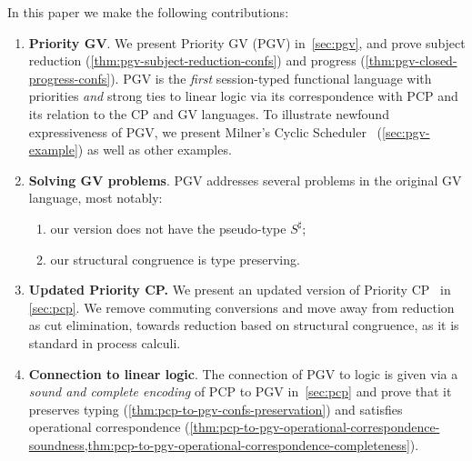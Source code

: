 \documentclass[main.tex]{subfiles}
\begin{document}
In this paper we make the following contributions:
\begin{enumerate}
\item
\textbf{Priority GV}. We present Priority GV (PGV) in~\cref{sec:pgv}, and prove subject reduction (\cref{thm:pgv-subject-reduction-confs}) and progress (\cref{thm:pgv-closed-progress-confs}).
PGV is the \emph{first} session-typed functional language with priorities \emph{and} strong ties to linear logic via its correspondence with PCP and its relation to the CP and GV languages.
To illustrate newfound expressiveness of PGV, we present Milner's Cyclic Scheduler~\cite{milner89} (\cref{sec:pgv-example}) as well as other examples.


 \item
 \textbf{Solving GV problems}. PGV addresses several problems in the original GV language, most notably:
 	\begin{enumerate}
	\item our version does not have the pseudo-type $S^\sharp$;
	\item our structural congruence is type preserving.
	\end{enumerate}
\item
\textbf{Updated Priority CP.} We present an updated version of Priority CP~\cite{dardhagay18} in \cref{sec:pcp}. We remove commuting conversions and move away from reduction as cut elimination, towards reduction based on structural congruence, as it is standard in process calculi. %

\item
\textbf{Connection to linear logic}. The connection of PGV to logic is given via a \emph{sound and complete encoding} of PCP to PGV in~\cref{sec:pcp} and prove that it preserves typing (\cref{thm:pcp-to-pgv-confs-preservation}) and satisfies operational correspondence (\cref{thm:pcp-to-pgv-operational-correspondence-soundness,thm:pcp-to-pgv-operational-correspondence-completeness}).  %
\end{enumerate}
\end{document}
